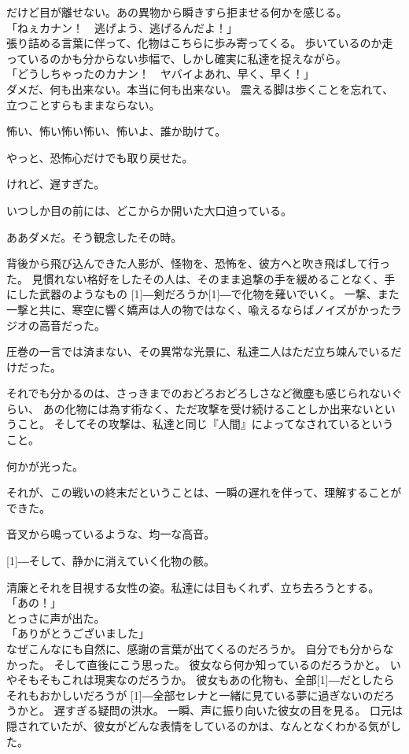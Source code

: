 \documentclass[../IHMain]{subfiles}
\begin{document}
だけど目が離せない。あの異物から瞬きすら拒ませる何かを感じる。\\
「ねぇカナン！　逃げよう、逃げるんだよ！」\\
張り詰める言葉に伴って、化物はこちらに歩み寄ってくる。
歩いているのか走っているのかも分からない歩幅で、しかし確実に私達を捉えながら。\\
「どうしちゃったのカナン！　ヤバイよあれ、早く、早く！」\\
ダメだ、何も出来ない。本当に何も出来ない。
震える脚は歩くことを忘れて、立つことすらもままならない。

怖い、怖い怖い怖い、怖いよ、誰か助けて。

やっと、恐怖心だけでも取り戻せた。

けれど、遅すぎた。

いつしか目の前には、どこからか開いた大口迫っている。

ああダメだ。そう観念したその時。

背後から飛び込んできた人影が、怪物を、恐怖を、彼方へと吹き飛ばして行った。
見慣れない格好をしたその人は、そのまま追撃の手を緩めることなく、手にした武器のようなもの
\scalebox{3}[1]{―}剣だろうか\scalebox{3}[1]{―}で化物を薙いでいく。
一撃、また一撃と共に、寒空に響く嬌声は人の物ではなく、喩えるならばノイズがかったラジオの高音だった。

圧巻の一言では済まない、その異常な光景に、私達二人はただ立ち竦んでいるだけだった。

それでも分かるのは、さっきまでのおどろおどろしさなど微塵も感じられないぐらい、
あの化物には為す術なく、ただ攻撃を受け続けることしか出来ないということ。
そしてその攻撃は、私達と同じ『人間』によってなされているということ。

何かが光った。

それが、この戦いの終末だということは、一瞬の遅れを伴って、理解することができた。

音叉から鳴っているような、均一な高音。

\scalebox{3}[1]{―}そして、静かに消えていく化物の骸。

清廉とそれを目視する女性の姿。私達には目もくれず、立ち去ろうとする。\\
「あの！」\\
とっさに声が出た。\\
「ありがとうございました」\\
なぜこんなにも自然に、感謝の言葉が出てくるのだろうか。
自分でも分からなかった。
そして直後にこう思った。
彼女なら何か知っているのだろうかと。
いやそもそもこれは現実なのだろうか。
彼女もあの化物も、全部\scalebox{3}[1]{―}だとしたらそれもおかしいだろうが
\scalebox{3}[1]{―}全部セレナと一緒に見ている夢に過ぎないのだろうかと。
遅すぎる疑問の洪水。
一瞬、声に振り向いた彼女の目を見る。
口元は隠されていたが、彼女がどんな表情をしているのかは、なんとなくわかる気がした。
\end{document}
